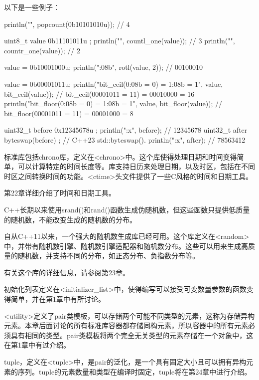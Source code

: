 以下是一些例子：

\begin{cpp}
println("{}", popcount(0b10101010u)); // 4

uint8_t value { 0b11101011u };
println("{}", countl_one(value)); // 3
println("{}", countr_one(value)); // 2

value = 0b10001000u;
println("{:08b}", rotl(value, 2)); // 00100010

value = 0b00001011u;
println("bit_ceil({0:08b} = {0}) = {1:08b} = {1}",
    value, bit_ceil(value)); // bit_ceil(00001011 = 11) = 00010000 = 16
println("bit_floor({0:08b} = {0}) = {1:08b} = {1}",
    value, bit_floor(value)); // bit_floor(00001011 = 11) = 00001000 = 8

uint32_t before { 0x12345678u };
println("{:x}", before); // 12345678
uint32_t after { byteswap(before) }; // C++23 std::byteswap().
println("{:x}", after); // 78563412
\end{cpp}


标准库包括chrono库，定义在<chrono>中。这个库使得处理日期和时间变得简单，可以计算特定的时间长度等。库支持日历来处理日期，以及时区，包括在不同时区之间转换时间的功能。<ctime>头文件提供了一些C风格的时间和日期工具。

第22章详细介绍了时间和日期工具。


C++长期以来使用srand()和rand()函数生成伪随机数，但这些函数只提供低质量的随机数，不能改变生成的随机数的分布。

自从C++11以来，一个强大的随机数生成库已经可用。这个库定义在<random>中，并带有随机数引擎、随机数引擎适配器和随机数分布。这些可以用来生成高质量的随机数，并支持不同的分布，如正态分布、负指数分布等。

有关这个库的详细信息，请参阅第23章。


初始化列表定义在<initializer\_list>中，使得编写可以接受可变数量参数的函数变得简单，并在第1章中有所讨论。


<utility>定义了pair类模板，可以存储两个可能不同类型的元素，这称为存储异构元素。本章后面讨论的所有标准库容器都存储同构元素，所以容器中的所有元素必须具有相同的类型。pair类模板将两个完全无关类型的元素存储在一个对象中，这在第1章中有过介绍。

tuple，定义在<tuple>中，是pair的泛化，是一个具有固定大小且可以拥有异构元素的序列。tuple的元素数量和类型在编译时固定，tuple将在第24章中进行介绍。

